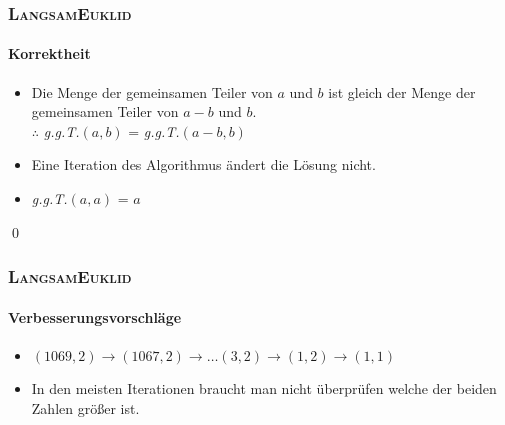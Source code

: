 \documentclass[•]{beamer}
\begin{document}
\begin{frame}
	\frametitle{\textsc{LangsamEuklid}}
	\framesubtitle{Korrektheit}
	\begin{itemize}
	\item Die Menge der gemeinsamen Teiler von $a$ und $b$ ist gleich der Menge der gemeinsamen Teiler von $a-b$ und $b$.\\
	 $\therefore$ \textit{g.g.T.}$(a,b)$ = \textit{g.g.T.}$(a-b,b)$
	\item Eine Iteration des Algorithmus \"andert die L\"osung nicht.
	\item \textit{g.g.T.}$(a,a)$ = $a$
	\end{itemize}
\qed
\end{frame}
\begin{frame}
	\frametitle{\textsc{LangsamEuklid}}
	\framesubtitle{Verbesserungsvorschl\"age}
	\begin{itemize}
	\item $(1069,2) \rightarrow (1067,2) \rightarrow \dots (3,2) \rightarrow (1,2) \rightarrow (1,1)$
	\item In den meisten Iterationen braucht man nicht \"uberpr\"ufen welche der beiden Zahlen gr\"o{\ss}er ist.
	\end{itemize}
\end{frame}
\end{document}
